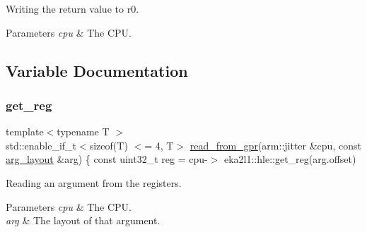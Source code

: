 Writing the return value to r0. 


\begin{DoxyParams}{Parameters}
{\em cpu} & The C\+PU. \\
\hline
\end{DoxyParams}


\subsection{Variable Documentation}
\mbox{\label{namespaceeka2l1_1_1hle_ae2b6a20800f71c68b2eb69e136b73b39}} 
\subsubsection{\texorpdfstring{get\+\_\+reg}{get\_reg}}
{\footnotesize\ttfamily template$<$typename T $>$ \\
std\+::enable\+\_\+if\+\_\+t$<$sizeof(T) $<$= 4, T$>$ \mbox{\hyperlink{namespaceeka2l1_1_1hle_a968725b7666c3d213e81ac7265711168}{read\+\_\+from\+\_\+gpr}}(arm\+::jitter \&cpu, const \mbox{\hyperlink{structeka2l1_1_1hle_1_1arg__layout}{arg\+\_\+layout}} \&arg) \{ const uint32\+\_\+t reg = cpu-\/$>$ eka2l1\+::hle\+::get\+\_\+reg(arg.\+offset)}



Reading an argument from the registers. 


\begin{DoxyParams}{Parameters}
{\em cpu} & The C\+PU. \\
\hline
{\em arg} & The layout of that argument. \\
\hline
\end{DoxyParams}
